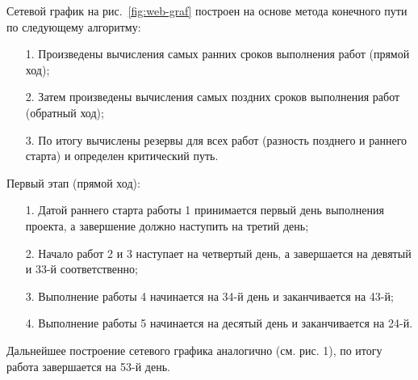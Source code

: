 \begin{center}
\end{center}

Сетевой график на рис.~\ref{fig:web-graf} построен на основе метода конечного пути по следующему алгоритму:
\begin{itemize}
	\item[1.] Произведены вычисления самых ранних сроков выполнения работ (прямой ход);
	\item[2.] Затем произведены вычисления самых поздних сроков выполнения работ (обратный ход);
	\item[3.] По итогу вычислены резервы для всех работ (разность позднего и раннего старта) и определен критический путь.
\end{itemize}

Первый этап (прямой ход):
\begin{itemize}
	\item[1.] Датой раннего старта работы 1 принимается первый день выполнения проекта, а завершение должно наступить на третий день;
	\item[2.] Начало работ 2 и 3 наступает на четвертый день, а завершается на девятый и 33-й соответственно;
	\item[3.] Выполнение работы 4 начинается на 34-й день и заканчивается на 43-й;
	\item[4.] Выполнение работы 5 начинается на десятый день и заканчивается на 24-й.
\end{itemize}
Дальнейшее построение сетевого графика аналогично (см. рис. 1), по итогу работа завершается на 53-й день.

